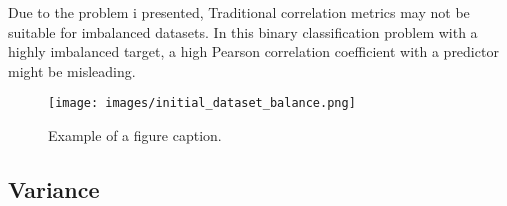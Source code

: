 Due to the problem i presented, Traditional correlation metrics may not be suitable for imbalanced datasets. In this binary classification problem with a highly imbalanced target, a high Pearson correlation coefficient with a predictor might be misleading.

\begin{figure}[htbp]
    \centerline{\texttt{[image: images/initial\_dataset\_balance.png]}}
    \caption{Example of a figure caption.}
    \label{initial_dataset_balance}
\end{figure}


\subsection{Variance}

\documentclass{article}
\usepackage{amsmath}


Given that your data is the result of a PCA transformation, several unique characteristics and considerations come into play:

\begin{enumerate}
    \item \textbf{Orthogonality:} The principal components resulting from PCA are orthogonal (uncorrelated). Thus, the correlation matrix of these components should be a diagonal matrix with ones on the diagonal (or very close to this in practice due to numerical precision).

    \item \textbf{Variance Explained:} One of the key aspects of PCA is the amount of variance explained by each principal component. The first few components typically capture the majority of the variance in the dataset, while the latter components capture less and less variance.
\end{enumerate}

Given these considerations, the variation analysis that makes the most sense for PCA-transformed data includes:

\begin{enumerate}
    \item \textbf{Variance Explained:}
          \begin{itemize}
              \item \textbf{Scree Plot:} A plot showing the fraction of total variance explained by each principal component. This helps in determining how many components to retain for further analysis.
          \end{itemize}
\end{enumerate}

